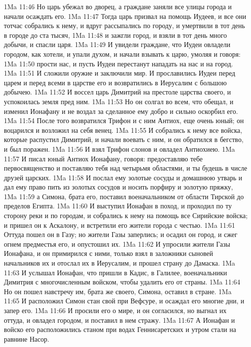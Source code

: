 \vs 1Ma 11:46 Но царь убежал во дворец, а граждане заняли все улицы города и начали осаждать его.
\vs 1Ma 11:47 Тогда царь призвал на помощь Иудеев, и все они тотчас собрались к нему, и вдруг рассыпались по городу, и умертвили в тот день в городе до ста тысяч,
\vs 1Ma 11:48 и зажгли город, и взяли в тот день много добычи, и спасли царя.
\vs 1Ma 11:49 И увидели граждане, что Иудеи овладели городом, как хотели, и упали духом, и начали взывать к царю, умоляя и говоря:
\vs 1Ma 11:50 прости нас, и пусть Иудеи перестанут нападать на нас и на город.
\vs 1Ma 11:51 И сложили оружие и заключили мир. И прославились Иудеи перед царем и перед всеми в царстве его и возвратились в Иерусалим с большою добычею.
\vs 1Ma 11:52 И воссел царь Димитрий на престоле царства своего, и успокоилась земля пред ним.
\vs 1Ma 11:53 Но он солгал во всем, что обещал, и изменил Ионафану и не воздал за сделанное ему добро и сильно оскорбил его.
\vs 1Ma 11:54 После того возвратился Трифон и с ним Антиох, еще очень юный; он воцарился и возложил на себя венец.
\vs 1Ma 11:55 И собрались к нему все войска, которые распустил Димитрий, и начали воевать с ним, и он обратился в бегство, и был поражен.
\vs 1Ma 11:56 И взял Трифон слонов и овладел Антиохиею.
\vs 1Ma 11:57 И писал юный Антиох Ионафану, говоря: предоставляю тебе первосвященство и поставляю тебя над четырьмя областями, и ты будешь в числе друзей царских.
\vs 1Ma 11:58 И послал ему золотые сосуды и домашнюю утварь и дал ему право пить из золотых сосудов и носить порфиру и золотую пряжку,
\vs 1Ma 11:59 а Симона, брата его, поставил военачальником от области Тирской до пределов Египта.
\vs 1Ma 11:60 И выступил Ионафан в поход, и проходил по ту сторону реки  и по городам, и собрались к нему на помощь все Сирийские войска; и пришел он к Аскалону, и встретили его жители города с честью.
\vs 1Ma 11:61 Оттуда пошел он в Газу; но жители Газы заперлись; и осадил он город, и сжег огнем предместья его, и опустошил их.
\vs 1Ma 11:62 И упросили жители Газы Ионафана, и он примирился с ними, только взял в заложники сыновей начальников их и отослал их в Иерусалим, и прошел страну до Дамаска.
\rsbpar\vs 1Ma 11:63 И услышал Ионафан, что пришли в Кадис, в Галилее, военачальники Димитрия с многочисленным войском, чтобы удалить его от страны.
\vs 1Ma 11:64 Но он пошел навстречу им, брата же своего, Симона, оставил в стране.
\vs 1Ma 11:65 И расположил Симон стан свой при Вефсуре, и осаждал его многие дни, и запер его.
\vs 1Ma 11:66 И просили его о мире, и он согласился, но выгнал их оттуда, и овладел городом, и поставил в нем стражу.
\vs 1Ma 11:67 А Ионафан и войско его расположились станом при водах Геннисаретских и утром стали на равнине Насор.
